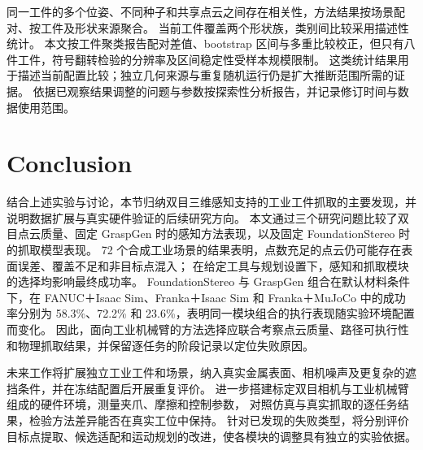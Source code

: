 \documentclass[UTF8,fontset=fandol,a4paper,11pt]{ctexart}
\newcommand{\qyb}[1]{#1}
\begin{document}
同一工件的多个位姿、不同种子和共享点云之间存在相关性，方法结果按场景配对、按工件及形状来源聚合。
当前工件覆盖两个形状族，类别间比较采用描述性统计。
本文按工件聚类报告配对差值、bootstrap 区间与多重比较校正，但只有八件工件，符号翻转检验的分辨率及区间稳定性受样本规模限制。
这类统计结果用于描述当前配置比较；独立几何来源与重复随机运行仍是扩大推断范围所需的证据。
依据已观察结果调整的问题与参数按探索性分析报告，并记录修订时间与数据使用范围。

\section{\qyb{Conclusion}}
\label{sec:conclusion}

结合上述实验与讨论，本节归纳双目三维感知支持的工业工件抓取的主要发现，并说明数据扩展与真实硬件验证的后续研究方向。
本文通过三个研究问题比较了双目点云质量、固定 GraspGen 时的感知方法表现，以及固定 FoundationStereo 时的抓取模型表现。
72 个合成工业场景的结果表明，点数充足的点云仍可能存在表面误差、覆盖不足和非目标点混入；
在给定工具与规划设置下，感知和抓取模块的选择均影响最终成功率。
FoundationStereo 与 GraspGen 组合在默认材料条件下，在 FANUC＋Isaac Sim、Franka＋Isaac Sim 和 Franka＋MuJoCo 中的成功率分别为
58.3\%、72.2\% 和 23.6\%，表明同一模块组合的执行表现随实验环境配置而变化。
因此，面向工业机械臂的方法选择应联合考察点云质量、路径可执行性和物理抓取结果，并保留逐任务的阶段记录以定位失败原因。

未来工作将扩展独立工业工件和场景，纳入真实金属表面、相机噪声及更复杂的遮挡条件，并在冻结配置后开展重复评价。
进一步搭建标定双目相机与工业机械臂组成的硬件环境，测量夹爪、摩擦和控制参数，
对照仿真与真实抓取的逐任务结果，检验方法差异能否在真实工位中保持。
针对已发现的失败类型，将分别评价目标点提取、候选适配和运动规划的改进，使各模块的调整具有独立的实验依据。

\begingroup
\small


\endgroup
\end{document}
